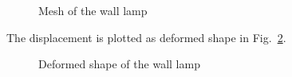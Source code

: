 \begin{figure}[!ht]
\begin{subfigure}[b]{0.48\linewidth}
{        }
    \end{subfigure}
    \begin{subfigure}[b]{0.48\linewidth}
        \centering
    \end{subfigure}
    \caption[Mesh of the wall lamp]{Mesh of the wall lamp}
    \label{oct_ex:lamp_mesh}
\end{figure}
%
The displacement is plotted as deformed shape in Fig.~\ref{oct_ex:lamp_deformed_shape}.
\begin{figure}[!ht]
    \centering
    \caption[Deformed shape of the wall lamp]{Deformed shape of the wall lamp}
    \label{oct_ex:lamp_deformed_shape}
\end{figure}
